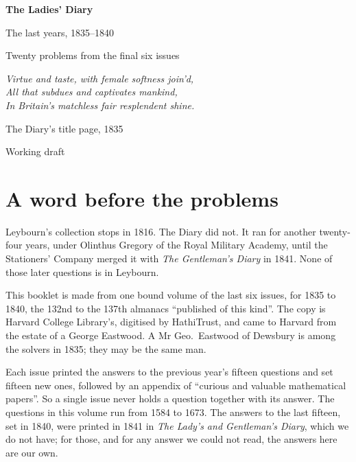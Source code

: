 \documentclass[11pt,a4paper]{article}
\newcounter{prob}
\begin{document}
\begin{titlepage}
\centering
\vspace*{3cm}
{\Huge\bfseries The Ladies' Diary\par}
\vspace{0.4cm}
{\LARGE The last years, 1835--1840\par}
\vspace{0.8cm}
{\Large Twenty problems from the final six issues\par}
\vspace{2cm}
{\large\itshape Virtue and taste, with female softness join'd,\\
All that subdues and captivates mankind,\\
In Britain's matchless fair resplendent shine.\par}
\vspace{0.3cm}
{\small The Diary's title page, 1835\par}
\vfill
{\large Working draft\par}
\end{titlepage}

\section*{A word before the problems}

Leybourn's collection stops in 1816. The Diary did not. It ran for another
twenty-four years, under Olinthus Gregory of the Royal Military Academy, until the
Stationers' Company merged it with \textit{The Gentleman's Diary} in 1841. None of those
later questions is in Leybourn.

This booklet is made from one bound volume of the last six issues, for 1835 to 1840, the
132nd to the 137th almanacs ``published of this kind''. The copy is Harvard College
Library's, digitised by HathiTrust, and came to Harvard from the estate of a George
Eastwood. A Mr Geo.\ Eastwood of Dewsbury is among the solvers in 1835; they may be the
same man.

Each issue printed the answers to the previous year's fifteen questions and set fifteen
new ones, followed by an appendix of ``curious and valuable mathematical papers''. So a
single issue never holds a question together with its answer. The questions in this
volume run from 1584 to 1673. The answers to the last fifteen, set in 1840, were printed
in 1841 in \textit{The Lady's and Gentleman's Diary}, which we do not have; for those, and
for any answer we could not read, the answers here are our own.
\end{document}
